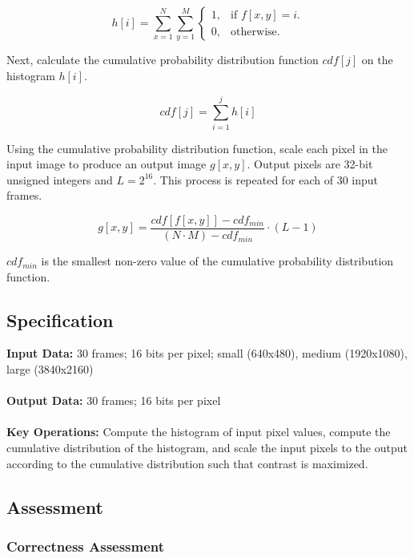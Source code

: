 \documentclass{report}
\begin{document}
\begin{equation}
 h[i] = \sum_{x=1}^{N} \sum_{y=1}^{M}
    \begin{cases}
    1, & \text{if $f[x,y]=i$}.\\
    0, & \text{otherwise}.
    \end{cases}
\end{equation}

Next, calculate the cumulative probability distribution function $cdf[j]$ on the
histogram $h[i]$.

\begin{equation}
 cdf[j] = \sum_{i = 1}^{j} h[i]
\end{equation}

Using the cumulative probability distribution function, scale each pixel in the
input image to produce an output image $g[x,y]$.
Output pixels are 32-bit unsigned integers and $L = 2^{16}$.
This process is repeated for each of 30 input frames.

\begin{equation}
 g[x,y] = \frac{cdf[ f[x,y] ] - cdf_{min}}{(N \cdot M) - cdf_{min}}
    \cdot (L - 1)
\end{equation}

$cdf_{min}$ is the smallest non-zero value of the cumulative probability
distribution function.

\subsection{Specification}

\textbf{Input Data:}  30 frames; 16 bits per pixel; small (640x480), medium (1920x1080), large (3840x2160) \\ \\
\textbf{Output Data:}  30 frames; 16 bits per pixel \\ \\
\textbf{Key Operations:}  Compute the histogram of input pixel values, compute
  the cumulative distribution of the histogram, and scale the input pixels to
  the output according to the cumulative distribution such that contrast is
  maximized.

\subsection{Assessment}

\subsubsection{Correctness Assessment}
\end{document}
